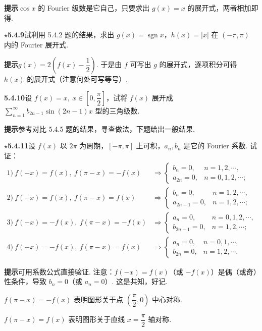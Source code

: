 \documentclass[UTF8,12pt,a4paper,fontset=fandol]{ctexart}
\begin{document}
\noindent\textbf{提示}\quad $\cos x$ 的 Fourier 级数是它自己，只要求出 $g(x)=x$ 的展开式，两者相加即得.

\noindent\(\star\)\textbf{5.4.9}\quad 试利用 5.4.2 题的结果，求出 $g(x)=\operatorname{sgn}x$，$h(x)=|x|$ 在
$(-\pi,\pi)$ 内的 Fourier 展开式.

\noindent\textbf{提示}\quad $g(x)=2\left(f(x)-\dfrac12\right)$. 于是由 $f$ 可写出 $g$ 的展开式，逐项积分可得
$h(x)$ 的展开式（注意何处可写等号）.

\noindent\textbf{5.4.10}\quad 设 $f(x)=x,\ x\in\left[0,\dfrac{\pi}{2}\right]$，试将 $f(x)$ 展开成
$\displaystyle\sum_{n=1}^{\infty}b_{2n-1}\sin(2n-1)x$ 型的三角级数.

\noindent\textbf{提示}\quad 参考对比 5.4.5 题的结果，寻查做法，下题给出一般结果.

\noindent\(\star\)\textbf{5.4.11}\quad 设 $f(x)$ 以 $2\pi$ 为周期，$[-\pi,\pi]$ 上可积，$a_n,b_n$ 是它的 Fourier 系数. 试证：
\[
\begin{array}{ll}
1)\ f(-x)=f(x),\ f(\pi-x)=-f(x)
&\Rightarrow
\begin{cases}
b_n=0,&n=1,2,\cdots,\\
a_{2n}=0,&n=0,1,2,\cdots;
\end{cases}\\[10pt]
2)\ f(-x)=f(x),\ f(\pi-x)=f(x)
&\Rightarrow
\begin{cases}
b_n=0,&n=1,2,\cdots,\\
a_{2n-1}=0,&n=1,2,\cdots;
\end{cases}\\[10pt]
3)\ f(-x)=-f(x),\ f(\pi-x)=-f(x)
&\Rightarrow
\begin{cases}
a_n=0,&n=0,1,2,\cdots,\\
b_{2n-1}=0,&n=1,2,\cdots;
\end{cases}\\[10pt]
4)\ f(-x)=-f(x),\ f(\pi-x)=f(x)
&\Rightarrow
\begin{cases}
a_n=0,&n=0,1,\cdots,\\
b_{2n}=0,&n=1,2,\cdots.
\end{cases}
\end{array}
\]

\noindent\textbf{提示}\quad 可用系数公式直接验证. 注意：$f(-x)=f(x)$（或 $-f(x)$）是偶（或奇）性条件，导致
$b_n=0$（或 $a_n=0$）. 这是共知，好记.

$f(\pi-x)=-f(x)$ 表明图形关于点 $\left(\dfrac{\pi}{2},0\right)$ 中心对称.

$f(\pi-x)=f(x)$ 表明图形关于直线 $x=\dfrac{\pi}{2}$ 轴对称.
\end{document}
